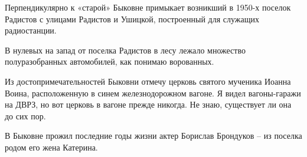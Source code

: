 Перпендикулярно к «старой» Быковне примыкает возникший в 1950-х поселок Радистов с улицами Радистов и Ушицкой, построенный для служащих радиостанции. 




В нулевых на запад от поселка Радистов в лесу лежало множество полуразобранных автомобилей, как понимаю ворованных.

Из достопримечательностей Быковни отмечу церковь святого мученика Иоанна Воина, расположенную в синем железнодорожном вагоне. Я видел вагоны-гаражи на ДВРЗ, но вот церковь в вагоне прежде никогда. Не знаю, существует ли она до сих пор.

В Быковне прожил последние годы жизни актер Борислав Брондуков – из поселка родом его жена Катерина.\\
